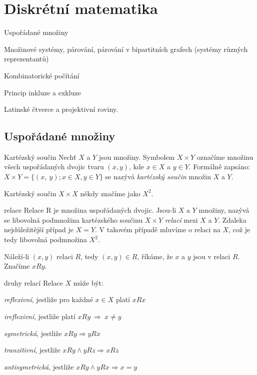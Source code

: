 \def\Nat{\mathbb{N}}
\def\Real{\mathbb{R}}
\def\Pot{\mathcal{P}}

\section{Diskrétní matematika}

\begin{pozadavky}
\begin{pitemize}
\item Uspořádané množiny
\item Množinové systémy, párování, párování v bipartitních grafech (systémy různých reprezentantů)
\item Kombinatorické počítání
\item Princip inkluze a exkluze
\item Latinské čtverce a projektivní roviny.
\end{pitemize}
\end{pozadavky}

\subsection{Uspořádané množiny}

\begin{definiceN}{Kartézský součin}
Nechť $X$ a $Y$ jsou množiny. Symbolem $X \times Y$ označíme množinu všech uspořádaných dvojic tvaru $(x,y)$, kde $x \in X$ a $y \in Y$. Formálně zapsáno:
$X \times Y = \{ (x,~y); x \in X, y \in Y \}$ se nazývá \emph{kartézský součin} množin $X$ a $Y$.

Kartézský součin $X \times X$ někdy značíme jako $X^2$. 
\end{definiceN}

\begin{definiceN}{relace}
Relace R je množina uspořádaných dvojic. Jsou-li $X$ a $Y$ množiny, nazývá se libovolná podmnožina kartézského součinu $X \times Y$ \emph{relací} mezi $X$ a $Y$. Zdaleka nejdůležitější případ je $X=Y$. V takovém případě mluvíme o relaci na $X$, což je tedy libovolná podmnožina $X^2$.

Náleží-li $(x,y)$ relaci $R$, tedy $(x,y) \in R$, říkáme, že $x$ a $y$ jsou v relaci $R$. Značíme $xRy$.
\end{definiceN}

\begin{definiceN}{druhy relací}
Relace $X$ může být:
\begin{pitemize}
	\item \emph{reflexivní}, jestliže pro každné $x \in X$ platí $xRx$
	\item \emph{ireflexivní}, jestliže platí $xRy\ \Rightarrow\ x\neq y$
	\item \emph{symetrická}, jestliže $xRy \Rightarrow yRx$
	\item \emph{tranzitivní}, jestliže $xRy \wedge yRz \Rightarrow xRz$
	\item \emph{antisymetrická}, jestliže $xRy \wedge yRx \Rightarrow x=y$
\end{pitemize}
\end{definiceN}

